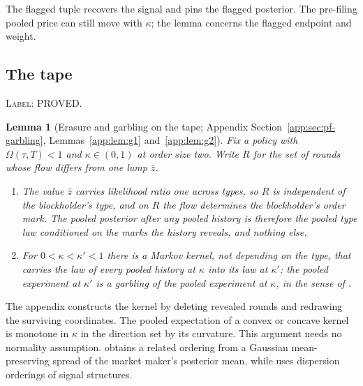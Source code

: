 \documentclass[11pt]{article}
\newtheorem{lemma}{Lemma}
\begin{document}
The flagged tuple recovers the signal and pins the flagged posterior. The pre-filing pooled price
can still move with $\kappa$; the lemma concerns the flagged endpoint and weight.

\subsection{The tape}
\label{sec:garbling}

\noindent\textsc{Label: PROVED.}\par
\begin{lemma}[Erasure and garbling on the tape; Appendix Section~\ref{app:sec:pf-garbling}, Lemmas~\ref{app:lem:g1} and~\ref{app:lem:g2}]
\label{lem:garbling}
Fix a policy with $\Omega(\tau,T)<1$ and $\kappa\in(0,1)$ at order size two. Write $R$ for
the set of rounds whose flow differs from one lump $\bar z$.
\begin{enumerate}[label=(\alph*),leftmargin=2.4em,itemsep=2pt]
\item The value $\bar z$ carries likelihood ratio one across types, so $R$ is independent of
  the blockholder's type, and on $R$ the flow determines the blockholder's order mark. The
  pooled posterior after any pooled history is therefore the pooled type law conditioned on
  the marks the history reveals, and nothing else.
\item For $0 < \kappa < \kappa' < 1$ there is a Markov kernel, not depending on the type, that
  carries the law of every pooled history at $\kappa$ into its law at $\kappa'$: the pooled
  experiment at $\kappa'$ is a garbling of the pooled experiment at $\kappa$, in the sense of
  \citet{Blackwell1953}.
\end{enumerate}
\end{lemma}

The appendix constructs the kernel by deleting revealed rounds and redrawing the surviving
coordinates. The pooled expectation of a convex or concave kernel is monotone in $\kappa$ in the
direction set by its curvature. This argument needs no normality assumption. \citet{BackEtAl2018}
obtains a related ordering from a Gaussian mean-preserving spread of the market maker's posterior
mean, while \citet{Ganuzapenalva2010} uses dispersion orderings of signal structures.
\end{document}
